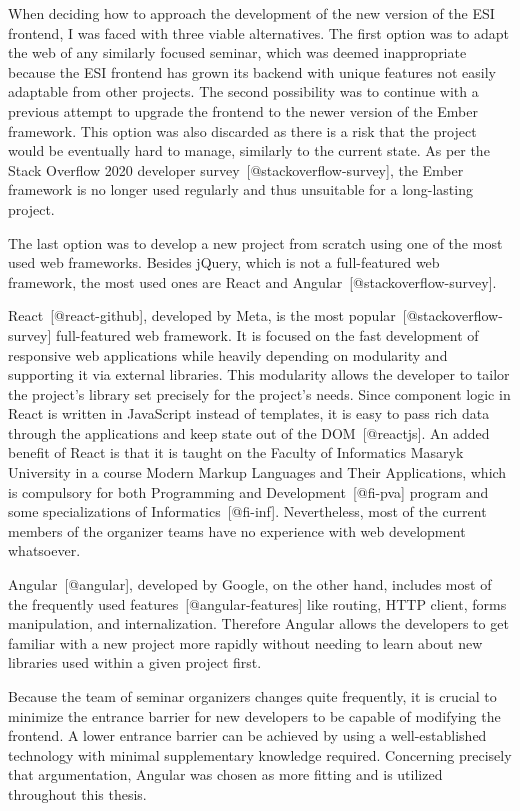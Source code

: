 \documentclass[
  digital, %
  oneside, %
  lof,     %
  lot,     %
]{fithesis4}
\begin{document}
When deciding how to approach the development of the new version of the ESI frontend, I was faced with three viable alternatives. The first option was to adapt the web of any similarly focused seminar, which was deemed inappropriate because the ESI frontend has grown its backend with unique features not easily adaptable from other projects. The second possibility was to continue with a previous attempt to upgrade the frontend to the newer version of the Ember framework. This option was also discarded as there is a risk that the project would be eventually hard to manage, similarly to the current state. As per the Stack Overflow 2020 developer survey~[@stackoverflow-survey], the Ember framework is no longer used regularly and thus unsuitable for a long-lasting project.

The last option was to develop a new project from scratch using one of the most used web frameworks. Besides jQuery, which is not a full-featured web framework, the most used ones are React and Angular~[@stackoverflow-survey].

React~[@react-github], developed by Meta, is the most popular~[@stackoverflow-survey] full-featured web framework. It is focused on the fast development of responsive web applications while heavily depending on modularity and supporting it via external libraries. This modularity allows the developer to tailor the project's library set precisely for the project's needs. Since component logic in React is written in JavaScript instead of templates, it is easy to pass rich data through the applications and keep state out of the DOM~[@reactjs]. An added benefit of React is that it is taught on the Faculty of Informatics Masaryk University in a course Modern Markup Languages and Their Applications, which is compulsory for both
Programming and Development~[@fi-pva] program and some specializations of Informatics~[@fi-inf]. Nevertheless, most of the current members of the organizer teams have no experience with web development whatsoever.

Angular~[@angular], developed by Google, on the other hand, includes most of the frequently used features~[@angular-features] like routing, HTTP client, forms manipulation, and internalization. Therefore Angular allows the developers to get familiar with a new project more rapidly without needing to learn about new libraries used within a given project first.

Because the team of seminar organizers changes quite frequently, it is crucial to minimize the entrance barrier for new developers to be capable of modifying the frontend. A lower entrance barrier can be achieved by using a well-established technology with minimal supplementary knowledge required. Concerning precisely that argumentation, Angular was chosen as more fitting and is utilized throughout this thesis.
\end{document}
